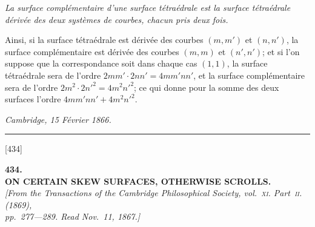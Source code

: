 \documentclass[12pt,a4paper]{article}
\newcommand{\paperref}[1]{\textup{[#1]}}
\theoremstyle{definition}
\begin{document}
\textit{La surface compl\'ementaire d'une surface t\'etra\'edrale est la surface t\'etra\'edrale d\'eriv\'ee des deux syst\`emes de courbes, chacun pris deux fois.}

Ainsi, si la surface t\'etra\'edrale est d\'eriv\'ee des courbes $(m, m')$ et $(n, n')$, la surface compl\'ementaire est d\'eriv\'ee des courbes $(m, m)$ et $(n', n')$; et si l'on suppose que la correspondance soit dans chaque cas $(1, 1)$, la surface t\'etra\'edrale sera de l'ordre $2mm' \cdot 2nn' = 4mm'nn'$, et la surface compl\'ementaire sera de l'ordre $2m^2 \cdot 2n'^2 = 4m^2n'^2$; ce qui donne pour la somme des deux surfaces l'ordre $4mm'nn' + 4m^2n'^2$.

\begin{flushright}
\textit{Cambridge, 15 F\'evrier 1866.}
\end{flushright}

\bigskip
\noindent\rule{\textwidth}{0.4pt}


\newpage
\setcounter{page}{55}

\noindent\paperref{434}\quad
\begin{center}
\textbf{434.}\\[6pt]
\textbf{ON CERTAIN SKEW SURFACES, OTHERWISE SCROLLS.}\\[4pt]
\small
\textit{[From the \textit{Transactions of the Cambridge Philosophical Society}, vol.~\textsc{xi}. Part~\textsc{ii}. (1869),\\
pp.~277---289. Read Nov.~11, 1867.]}
\end{center}
\end{document}
